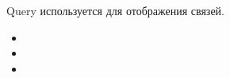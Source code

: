 \newcommand{\QueryUsing}{
      \begin{itemize}
            \item \QueryByUsingContextMenu
            \item \QueryByUsingClientHandler
            \item \QueryByUsingLinks
      \end{itemize}
}

\newcommand*{\QueryDescription}{
  Query используется для отображения связей.
  \QueryUsing
}
\QueryDescription